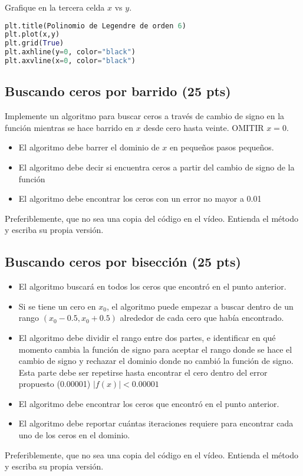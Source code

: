 \documentclass{article}
\begin{document}
Grafique en la tercera celda $x$ vs $y$.
\begin{lstlisting}[language=Python]
plt.title(Polinomio de Legendre de orden 6)
plt.plot(x,y)
plt.grid(True)
plt.axhline(y=0, color="black")
plt.axvline(x=0, color="black")
\end{lstlisting}

\subsection{Buscando ceros por barrido (25 pts)}
Implemente un algoritmo para buscar ceros a través de cambio de signo
en la función mientras se hace barrido en $x$ desde cero hasta veinte.
OMITIR $x=0$.

\begin{itemize}
\item El algoritmo debe barrer el dominio de $x$ en pequeños pasos pequeños.
\item El algoritmo debe decir si encuentra ceros a partir del cambio de
  signo de la función
\item El algoritmo debe encontrar los ceros con un error no mayor a 0.01
\end{itemize}
Preferiblemente, que no sea una copia del código en el vídeo. Entienda
el método y escriba su propia versión.

\subsection{Buscando ceros por bisección (25 pts)}
\begin{itemize}
\item El algoritmo buscará en todos los ceros que encontró en el punto anterior.
\item Si se tiene un cero en $x_0$, el algoritmo  puede empezar a buscar
  dentro de un rango $(x_0 - 0.5 , x_0 + 0.5)$
  alrededor de cada cero que había encontrado.
\item El algoritmo debe dividir el rango entre dos partes, e identificar
  en qué momento cambia la función de signo para aceptar el rango
  donde se hace el cambio de signo y rechazar el dominio donde no
  cambió la función de signo. Esta parte debe ser repetirse hasta
  encontrar el cero dentro del error propuesto (0.00001)
  $|f(x)| < 0.00001$
\item El algoritmo debe encontrar los ceros que encontró en el punto
  anterior.
\item El algoritmo debe reportar cuántas iteraciones requiere para
  encontrar cada uno de los ceros en el dominio.
\end{itemize}
Preferiblemente, que no sea una copia del código en el vídeo. Entienda
el método y escriba su propia versión.
\end{document}
